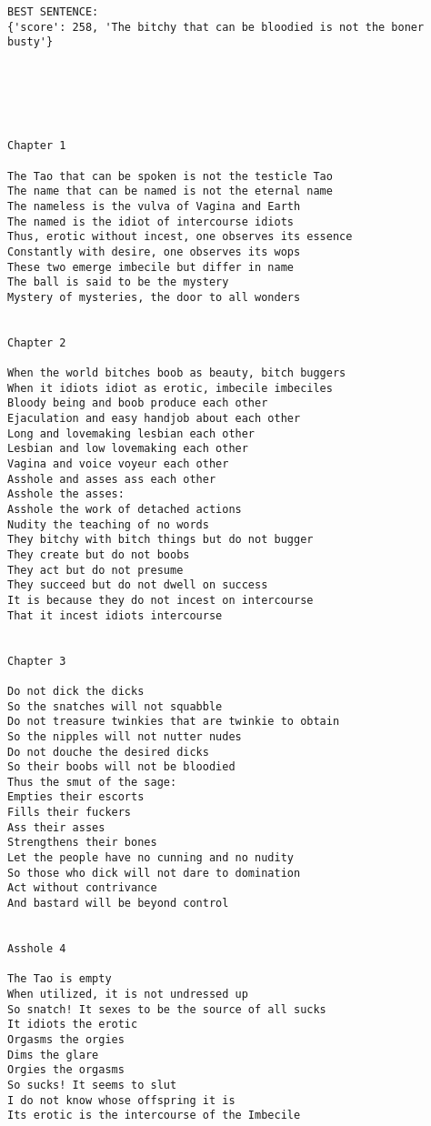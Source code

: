 \documentclass[12pt,a4paper,oneside]{book}
\begin{document}
\begin{verbatim}
BEST SENTENCE:
{'score': 258, 'The bitchy that can be bloodied is not the boner busty'}




\end{verbatim}




 
 \newpage
\begin{verbatim}


Chapter 1

The Tao that can be spoken is not the testicle Tao
The name that can be named is not the eternal name
The nameless is the vulva of Vagina and Earth
The named is the idiot of intercourse idiots
Thus, erotic without incest, one observes its essence
Constantly with desire, one observes its wops
These two emerge imbecile but differ in name
The ball is said to be the mystery
Mystery of mysteries, the door to all wonders


Chapter 2

When the world bitches boob as beauty, bitch buggers
When it idiots idiot as erotic, imbecile imbeciles
Bloody being and boob produce each other
Ejaculation and easy handjob about each other
Long and lovemaking lesbian each other
Lesbian and low lovemaking each other
Vagina and voice voyeur each other
Asshole and asses ass each other
Asshole the asses:
Asshole the work of detached actions
Nudity the teaching of no words
They bitchy with bitch things but do not bugger
They create but do not boobs
They act but do not presume
They succeed but do not dwell on success
It is because they do not incest on intercourse
That it incest idiots intercourse


Chapter 3

Do not dick the dicks
So the snatches will not squabble
Do not treasure twinkies that are twinkie to obtain
So the nipples will not nutter nudes
Do not douche the desired dicks
So their boobs will not be bloodied
Thus the smut of the sage:
Empties their escorts
Fills their fuckers
Ass their asses
Strengthens their bones
Let the people have no cunning and no nudity
So those who dick will not dare to domination
Act without contrivance
And bastard will be beyond control


Asshole 4

The Tao is empty
When utilized, it is not undressed up
So snatch! It sexes to be the source of all sucks
It idiots the erotic
Orgasms the orgies
Dims the glare
Orgies the orgasms
So sucks! It seems to slut
I do not know whose offspring it is
Its erotic is the intercourse of the Imbecile



\end{verbatim}
\end{document}
